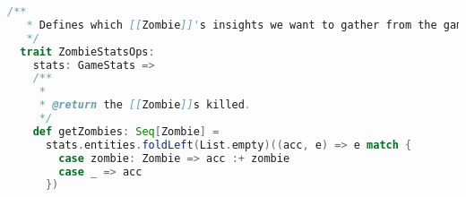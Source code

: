 \begin{lstlisting}[language=Scala, label=code:statistics, caption=Statistiche relative agli Zombie.]
  /**
   * Defines which [[Zombie]]'s insights we want to gather from the game.
   */
  trait ZombieStatsOps:
    stats: GameStats =>
    /**
     *
     * @return the [[Zombie]]s killed.
     */
    def getZombies: Seq[Zombie] =
      stats.entities.foldLeft(List.empty)((acc, e) => e match {
        case zombie: Zombie => acc :+ zombie
        case _ => acc
      })
\end{lstlisting}

